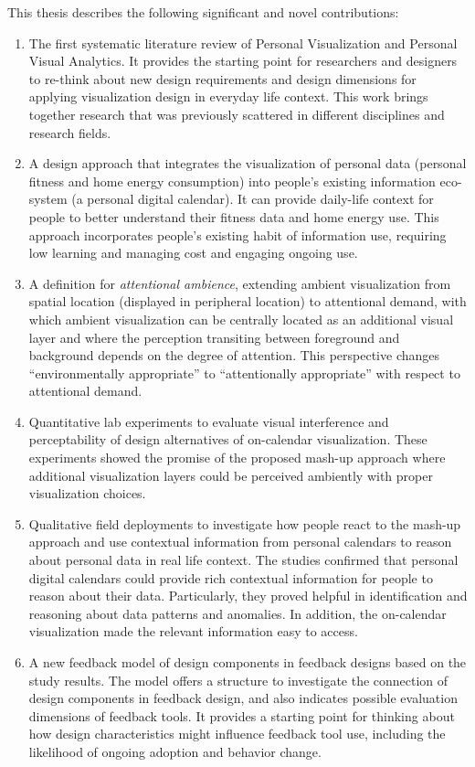\documentclass[12pt,oneside]{book}
\begin{document}
This thesis describes the following significant and novel contributions:
\begin{enumerate}
\item The first systematic literature review of Personal Visualization and Personal Visual Analytics.  It provides the starting point for researchers and designers to re-think about new design requirements and design dimensions for applying visualization design in everyday life context.  This work brings together research that was previously scattered in different disciplines and research fields.

\item A design approach that integrates the visualization of personal data (personal fitness and home energy consumption) into people's existing information eco-system (a personal digital calendar).  It can provide daily-life context for people to better understand their fitness data and home energy use.  This approach incorporates people's existing habit of information use, requiring low learning and managing cost and engaging ongoing use.

\item A definition for \textit{attentional ambience}, extending ambient visualization from spatial location (displayed in peripheral location) to attentional demand, with which ambient visualization can be centrally located as an additional visual layer and where the perception transiting between foreground and background depends on the degree of attention. This perspective changes ``environmentally appropriate'' to ``attentionally appropriate'' with respect to attentional demand.

\item Quantitative lab experiments to evaluate visual interference and perceptability of design alternatives of on-calendar visualization.  These experiments showed the promise of the proposed mash-up approach where additional visualization layers could be perceived ambiently with proper visualization choices.

\item Qualitative field deployments to investigate how people react to the mash-up approach and use contextual information from personal calendars to reason about personal data in real life context. The studies confirmed that personal digital calendars could provide rich contextual information for people to reason about their data. Particularly, they proved helpful in identification and reasoning about data patterns and anomalies.  In addition, the on-calendar visualization made the relevant information easy to access.

\item A new feedback model of design components in feedback designs based on the study results.  The model offers a structure to investigate the connection of design components in feedback design, and also indicates possible evaluation dimensions of feedback tools.  It provides a starting point for thinking about how design characteristics might influence feedback tool use, including the likelihood of ongoing adoption and behavior change.
  
\end{enumerate}
\end{document}
